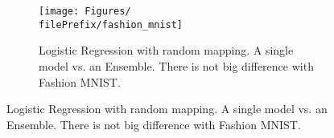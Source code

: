 \begin{figure}[H]
  \centering
  \begin{subfigure}[t]{0.5\linewidth}
    \centering\captionsetup{width=.8\linewidth}\texttt{[image: Figures/\\filePrefix/fashion\_mnist]}
    \caption{Logistic Regression with random mapping. A single model vs. an Ensemble. There is not big difference with Fashion MNIST.}
    \label{fig:\undPrefix_segment}
  \end{subfigure}%
\end{figure}




\let\major\undefined
\let\minor\undefined

\let\undPrefix\undefined
\let\dotPrefix\undefined
\let\scoPrefix\undefined

\let\filePrefix\undefined
